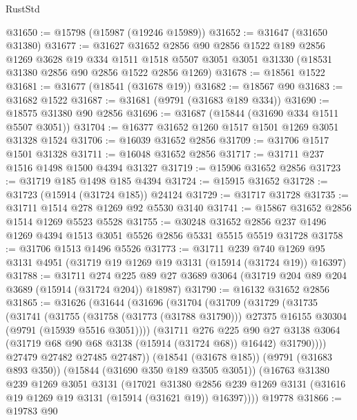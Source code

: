 \begin{lexlean}{RustStd}
\begin{coremodule}
@31650 := @15798 (@15987 (@19246 @15989))
@31652 := @31647 (@31650 @31380)
@31677 := @31627
    @31652
    @2856
    @90
    @2856
    @1522
    @189
    @2856
    @1269
    @3628
    @19
    @334
    @1511
    @1518
    @5507
    @3051
    @3051
    @31330
    (@18531 @31380 @2856 @90 @2856 @1522 @2856 @1269)
@31678 := @18561 @1522
@31681 := @31677 (@18541 (@31678 @19))
@31682 := @18567 @90
@31683 := @31682 @1522
@31687 := @31681 (@9791 (@31683 @189 @334))
@31690 := @18575 @31380 @90 @2856
@31696 := @31687 (@15844 (@31690 @334 @1511 @5507 @3051))
@31704 := @16377 @31652 @1260 @1517 @1501 @1269 @3051 @31328 @1524
@31706 := @16039 @31652 @2856
@31709 := @31706 @1517 @1501 @31328
@31711 := @16048 @31652 @2856
@31717 := @31711 @237 @1516 @1498 @1500 @4394 @31327
@31719 := @15906 @31652 @2856
@31723 := @31719 @185 @1498 @185 @4394
@31724 := @15915 @31652
@31728 := @31723 (@15914 (@31724 @185)) @24124
@31729 := @31717 @31728
@31735 := @31711 @1514 @278 @1269 @92 @5530 @3140
@31741 := @15867 @31652 @2856 @1514 @1269 @5523 @5528
@31755 := @30248
    @31652
    @2856
    @237
    @1496
    @1269
    @4394
    @1513
    @3051
    @5526
    @2856
    @5331
    @5515
    @5519
    @31728
@31758 := @31706 @1513 @1496 @5526
@31773 := @31711
    @239
    @740
    @1269
    @95
    @3131
    @4951
    (@31719 @19 @1269 @19 @3131 (@15914 (@31724 @19)) @16397)
@31788 := @31711
    @274
    @225
    @89
    @27
    @3689
    @3064
    (@31719 @204 @89 @204 @3689 (@15914 (@31724 @204)) @18987)
@31790 := @16132 @31652 @2856
@31865 := @31626
    (@31644
      (@31696
        (@31704
          (@31709
            (@31729
              (@31735
                (@31741
                  (@31755
                    (@31758 (@31773 (@31788 @31790)))
                    @27375
                    @16155
                    @30304
                    (@9791 (@15939 @5516 @3051))))
                (@31711
                  @276
                  @225
                  @90
                  @27
                  @3138
                  @3064
                  (@31719 @68 @90 @68 @3138 (@15914 (@31724 @68)) @16442)
                  @31790))))
          @27479
          @27482
          @27485
          @27487))
      (@18541 (@31678 @185))
      (@9791 (@31683 @893 @350))
      (@15844 (@31690 @350 @189 @3505 @3051))
      (@16763
        @31380
        @239
        @1269
        @3051
        @3131
        (@17021
          @31380
          @2856
          @239
          @1269
          @3131
          (@31616 @19 @1269 @19 @3131 (@15914 (@31621 @19)) @16397))))
    @19778
@31866 := @19783 @90

\end{coremodule}
\end{lexlean}
